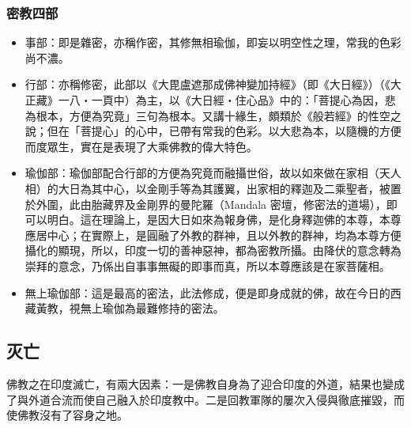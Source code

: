 \subsubsection{密教四部}
\begin{itemize}
  \item 事部：即是雜密，亦稱作密，其修無相瑜伽，即妄以明空性之理，常我的色彩尚不濃。
  \item 行部：亦稱修密，此部以《大毘盧遮那成佛神變加持經》（即《大日經》）（《大正藏》一八‧一頁中）為主，以《大日經‧住心品》中的：「菩提心為因，悲為根本，方便為究竟」三句為根本。又講十緣生，頗類於《般若經》的性空之說；但在「菩提心」的心中，已帶有常我的色彩。以大悲為本，以隨機的方便而度眾生，實在是表現了大乘佛教的偉大特色。
  \item 瑜伽部：瑜伽部配合行部的方便為究竟而融攝世俗，故以如來做在家相（天人相）的大日為其中心，以金剛手等為其護翼，出家相的釋迦及二乘聖者，被置於外圍，此由胎藏界及金剛界的曼陀羅（Mandala 密壇，修密法的道場），即可以明白。這在理論上，是因大日如來為報身佛，是化身釋迦佛的本尊，本尊應居中心；在實際上，是圓融了外教的群神，且以外教的群神，均為本尊方便攝化的顯現，所以，印度一切的善神惡神，都為密教所攝。由降伏的意念轉為崇拜的意念，乃係出自事事無礙的即事而真，所以本尊應該是在家菩薩相。
  \item 無上瑜伽部：這是最高的密法，此法修成，便是即身成就的佛，故在今日的西藏黃教，視無上瑜伽為最難修持的密法。
\end{itemize}

\subsection{灭亡}
佛教之在印度滅亡，有兩大因素：一是佛教自身為了迎合印度的外道，結果也變成了與外道合流而使自己融入於印度教中。二是回教軍隊的屢次入侵與徹底摧毀，而使佛教沒有了容身之地。
